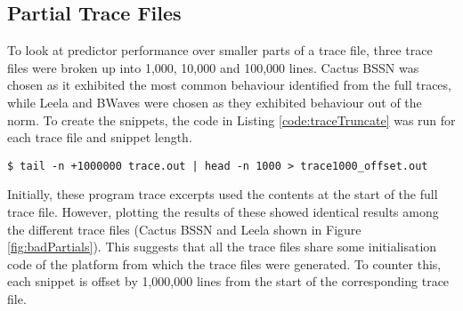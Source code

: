 \subsection{Partial Trace Files}
To look at predictor performance over smaller parts of a trace file, three trace files were broken up into 1,000, 10,000 and 100,000 lines. Cactus BSSN was chosen as it exhibited the most common behaviour identified from the full traces, while Leela and BWaves were chosen as they exhibited behaviour out of the norm. To create the snippets, the code in Listing \ref{code:traceTruncate} was run for each trace file and snippet length.

\noindent\begin{minipage}{\linewidth}
    \begin{lstlisting}[caption={Truncating a trace to 1,000 lines with 1,000,000 offset}, label={code:traceTruncate}, frame=single]
    $ tail -n +1000000 trace.out | head -n 1000 > trace1000_offset.out
\end{lstlisting}
\end{minipage}

Initially, these program trace excerpts used the contents at the start of the full trace file. However, plotting the results of these showed identical results among the different trace files (Cactus BSSN and Leela shown in Figure \ref{fig:badPartials}). This suggests that all the trace files share some initialisation code of the platform from which the trace files were generated. To counter this, each snippet is offset by 1,000,000 lines from the start of the corresponding trace file.

